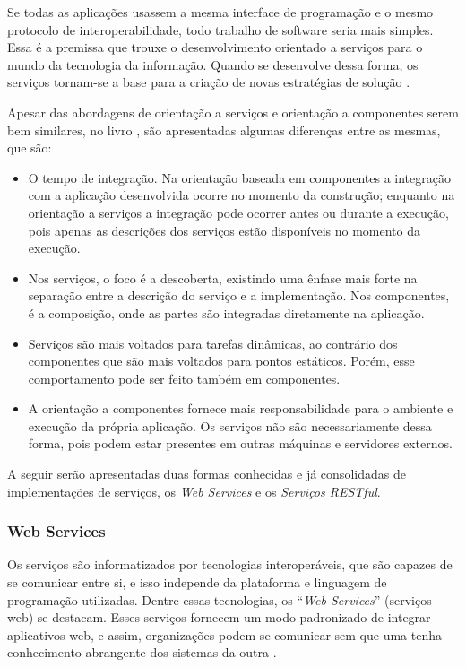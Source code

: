 Se todas as aplicações usassem a mesma interface de programação e o mesmo protocolo de interoperabilidade, todo trabalho de software seria mais simples. Essa é a premissa que trouxe o desenvolvimento orientado a serviços para o mundo da tecnologia da informação. Quando se desenvolve dessa forma, os serviços tornam-se a base para a criação de novas estratégias de solução \cite{Newcomer:Lomow:2004}.

Apesar das abordagens de orientação a serviços e orientação a componentes serem bem similares, no livro \cite{Stojanovic:Dahanayake:2005}, são apresentadas algumas diferenças entre as mesmas, que são:

\begin{itemize}
	\item O tempo de integração. Na orientação baseada em componentes a integração com a aplicação desenvolvida ocorre no momento da construção; enquanto na orientação a serviços a integração pode ocorrer antes ou durante a execução, pois apenas as descrições dos serviços estão disponíveis no momento da execução.
	\item Nos serviços, o foco é a descoberta, existindo uma ênfase mais forte na separação entre a descrição do serviço e a implementação. Nos componentes, é a composição, onde as partes são integradas diretamente na aplicação.
	\item Serviços são mais voltados para tarefas dinâmicas, ao contrário dos componentes que são mais voltados para pontos estáticos. Porém, esse comportamento pode ser feito também em componentes.
	\item A orientação a componentes fornece mais responsabilidade para o ambiente e execução da própria aplicação. Os serviços não são necessariamente dessa forma, pois podem estar presentes em outras máquinas e servidores externos.
\end{itemize}

A seguir serão apresentadas duas formas conhecidas e já consolidadas de implementações de serviços, os \textit{Web Services} e os \textit{Serviços RESTful}.

\subsubsection{Web Services}

Os serviços são informatizados por tecnologias interoperáveis, que são capazes de se comunicar entre si, e isso independe da plataforma e linguagem de programação utilizadas. Dentre essas tecnologias, os ``\textit{Web Services}'' (serviços web) se destacam. Esses serviços fornecem um modo padronizado de integrar aplicativos web, e assim, organizações podem se comunicar sem que uma tenha conhecimento abrangente dos sistemas da outra \cite{Victorino:Brascher:2009}.

